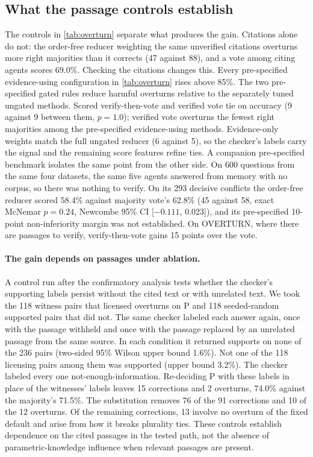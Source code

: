\subsection{What the passage controls establish}
\label{sec:ingredient}

The controls in \cref{tab:overturn} separate what produces the gain. Citations alone do not: the order-free reducer weighting the same unverified citations overturns more right majorities than it corrects (47 against 88), and a vote among citing agents scores 69.0\%. Checking the citations changes this. Every pre-specified evidence-using configuration in \cref{tab:overturn} rises above 85\%. The two pre-specified gated rules reduce harmful overturns relative to the separately tuned ungated methods. Scored verify-then-vote and verified vote tie on accuracy (9 against 9 between them, $p = 1.0$); verified vote overturns the fewest right majorities among the pre-specified evidence-using methods. Evidence-only weights match the full ungated reducer (6 against 5), so the checker's labels carry the signal and the remaining score features refine ties. A companion pre-specified benchmark isolates the same point from the other side. On 600 questions from the same four datasets, the same five agents answered from memory with no corpus, so there was nothing to verify. On its 293 decisive conflicts the order-free reducer scored 58.4\% against majority vote's 62.8\% (45 against 58, exact McNemar $p = 0.24$, Newcombe 95\% CI [$-0.111$, 0.023]), and its pre-specified 10-point non-inferiority margin was not established. On OVERTURN, where there are passages to verify, verify-then-vote gains 15 points over the vote.

\paragraph{The gain depends on passages under ablation.} A control run after the confirmatory analysis tests whether the checker's supporting labels persist without the cited text or with unrelated text. We took the 118 witness pairs that licensed overturns on P and 118 seeded-random supported pairs that did not. The same checker labeled each answer again, once with the passage withheld and once with the passage replaced by an unrelated passage from the same source. In each condition it returned supports on none of the 236 pairs (two-sided 95\% Wilson upper bound 1.6\%). Not one of the 118 licensing pairs among them was supported (upper bound 3.2\%). The checker labeled every one not-enough-information. Re-deciding P with these labels in place of the witnesses' labels leaves 15 corrections and 2 overturns, 74.0\% against the majority's 71.5\%. The substitution removes 76 of the 91 corrections and 10 of the 12 overturns. Of the remaining corrections, 13 involve no overturn of the fixed default and arise from how it breaks plurality ties. These controls establish dependence on the cited passages in the tested path, not the absence of parametric-knowledge influence when relevant passages are present.

